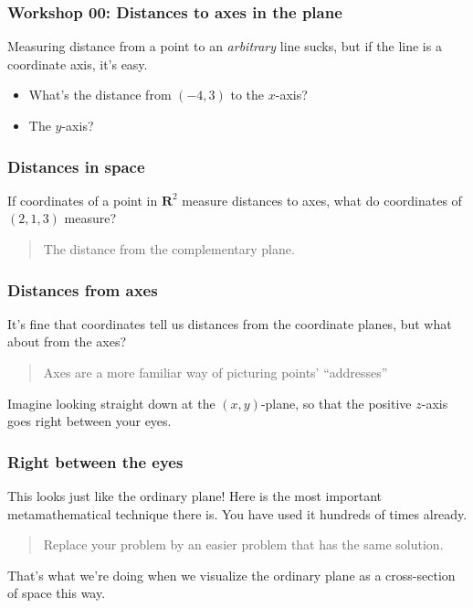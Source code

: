 \documentclass[11pt,ignorenonframetext,aspectratio=169]{beamer}
\begin{document}
\begin{frame}\frametitle{Workshop 00: Distances to axes in the plane}

Measuring distance from a point to an \emph{arbitrary} line sucks, but
if the line is a coordinate axis, it's easy.

\begin{itemize}[<+->]

\item
  What's the distance from $(-4,3)$ to the $x$-axis?
\item
  The $y$-axis?
\end{itemize}

\end{frame}

\begin{frame}\frametitle{Distances in space}

If coordinates of a point in $\mathbf{R}^2$ measure distances to axes,
what do coordinates of $(2,1,3)$ measure?

\begin{quote}
The distance from the complementary plane.
\end{quote}

\end{frame}

\begin{frame}\frametitle{Distances from axes}

It's fine that coordinates tell us distances from the coordinate planes,
but what about from the axes?

\begin{quote}
Axes are a more familiar way of picturing points' ``addresses''
\end{quote}

Imagine looking straight down at the $(x,y)$-plane, so that the positive
$z$-axis goes right between your eyes.

\end{frame}

\begin{frame}\frametitle{Right between the eyes}

This looks just like the ordinary plane! Here is the most important
metamathematical technique there is. You have used it hundreds of times
already.

\begin{quote}
Replace your problem by an easier problem that has the same solution.
\end{quote}

That's what we're doing when we visualize the ordinary plane as a
cross-section of space this way.

\end{frame}
\end{document}
